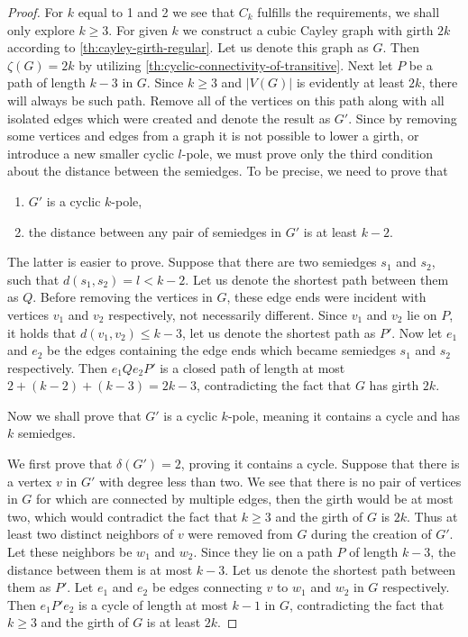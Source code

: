 \documentclass[12pt, twoside]{book}
\begin{document}
\begin{proof}
	For $k$ equal to 1 and 2 we see that $C_k$ fulfills the requirements, we shall only explore $k\geq 3$. For given $k$ we construct a cubic Cayley graph with girth $2k$ according to \cref{th:cayley-girth-regular}. Let us denote this graph as $G$. Then $\zeta(G)=2k$ by utilizing \cref{th:cyclic-connectivity-of-transitive}. Next let $P$ be a path of length $k-3$ in $G$. Since $k\geq 3$ and $|V(G)|$ is evidently at least $2k$, there will always be such path. Remove all of the vertices on this path along with all isolated edges which were created and denote the result as $G'$. Since by removing some vertices and edges from a graph it is not possible to lower a girth, or introduce a new smaller cyclic $l$-pole, we must prove only the third condition about the distance between the semiedges. To be precise, we need to prove that
	\begin{enumerate}
		\item $G'$ is a cyclic $k$-pole,
		\item the distance between any pair of semiedges in $G'$ is at least $k-2$.
	\end{enumerate}
	The latter is easier to prove. Suppose that there are two semiedges $s_1$ and $s_2$, such that $d(s_1,s_2)=l<k-2$. Let us denote the shortest path between them as $Q$. Before removing the vertices in $G$, these edge ends were incident with vertices $v_1$ and $v_2$ respectively, not necessarily different. Since $v_1$ and $v_2$ lie on $P$, it holds that $d(v_1,v_2)\leq k-3$, let us denote the shortest path as $P'$. Now let $e_1$ and $e_2$ be the edges containing the edge ends which became semiedges $s_1$ and $s_2$ respectively. Then $e_1Qe_2P'$ is a closed path of length at most $2+(k-2)+(k-3)=2k-3$, contradicting the fact that $G$ has girth $2k$.  
	
	Now we shall prove that $G'$ is a cyclic $k$-pole, meaning it contains a cycle and has $k$ semiedges. 
	
	We first prove that $\delta(G')=2$, proving it contains a cycle. Suppose that there is a vertex $v$ in $G'$ with degree less than two. We see that there is no pair of vertices in $G$ for which are connected by multiple edges, then the girth would be at most two, which would contradict the fact that $k\geq 3$ and the girth of $G$ is $2k$. Thus at least two distinct neighbors of $v$ were removed from $G$ during the creation of $G'$. Let these neighbors be $w_1$ and $w_2$. Since they lie on a path $P$ of length $k-3$, the distance between them is at most $k-3$. Let us denote the shortest path between them as $P'$. Let $e_1$ and $e_2$ be edges connecting $v$ to $w_1$ and $w_2$ in $G$ respectively. Then $e_1P'e_2$ is a cycle of length at most $k-1$ in $G$, contradicting the fact that $k\geq 3$ and the girth of $G$ is at least $2k$.
	

\end{proof}
\end{document}
